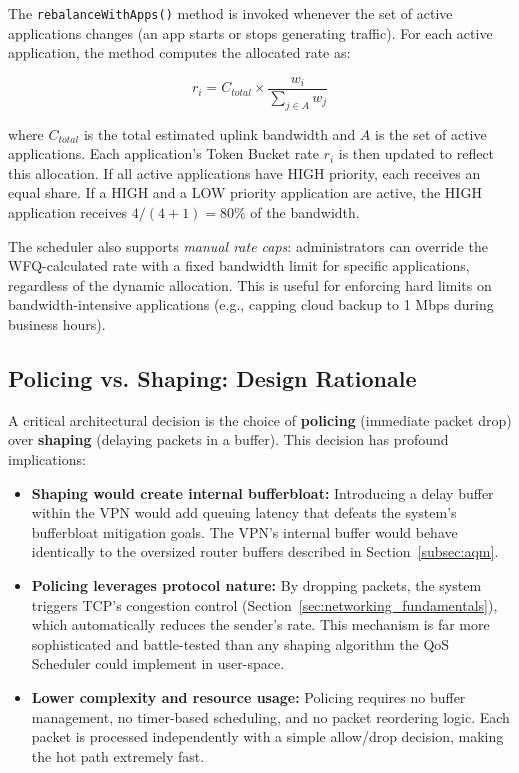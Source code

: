 The \texttt{rebalanceWithApps()} method is invoked whenever the set of active applications changes (an app starts or stops generating traffic). For each active application, the method computes the allocated rate as:

\begin{equation}
r_i = C_{total} \times \frac{w_i}{\sum_{j \in A} w_j}
\end{equation}

\noindent where $C_{total}$ is the total estimated uplink bandwidth and $A$ is the set of active applications. Each application's Token Bucket rate $r_i$ is then updated to reflect this allocation. If all active applications have HIGH priority, each receives an equal share. If a HIGH and a LOW priority application are active, the HIGH application receives $4/(4+1) = 80\%$ of the bandwidth.

The scheduler also supports \textit{manual rate caps}: administrators can override the WFQ-calculated rate with a fixed bandwidth limit for specific applications, regardless of the dynamic allocation. This is useful for enforcing hard limits on bandwidth-intensive applications (e.g., capping cloud backup to 1 Mbps during business hours).

\subsection{Policing vs. Shaping: Design Rationale}

A critical architectural decision is the choice of \textbf{policing} (immediate packet drop) over \textbf{shaping} (delaying packets in a buffer). This decision has profound implications:

\begin{itemize}[noitemsep]
    \item \textbf{Shaping would create internal bufferbloat:} Introducing a delay buffer within the VPN would add queuing latency that defeats the system's bufferbloat mitigation goals. The VPN's internal buffer would behave identically to the oversized router buffers described in Section~\ref{subsec:aqm}.
    \item \textbf{Policing leverages protocol nature:} By dropping packets, the system triggers TCP's congestion control (Section~\ref{sec:networking_fundamentals}), which automatically reduces the sender's rate. This mechanism is far more sophisticated and battle-tested than any shaping algorithm the QoS Scheduler could implement in user-space.
    \item \textbf{Lower complexity and resource usage:} Policing requires no buffer management, no timer-based scheduling, and no packet reordering logic. Each packet is processed independently with a simple allow/drop decision, making the hot path extremely fast.
\end{itemize}

